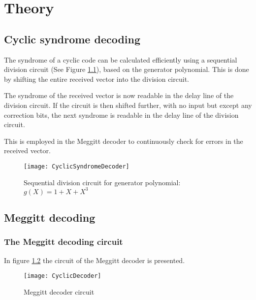 \documentclass[MiniProjectMain]{subfiles}
\begin{document}
\chapter{Theory}

\section{Cyclic syndrome decoding}
The syndrome of a cyclic code can be calculated efficiently using a sequential division circuit (See Figure \ref{fig:CyclicSyndromeDecoder}), based on the generator polynomial.
This is done by shifting the entire received vector into the division circuit.

The syndrome of the received vector is now readable in the delay line of the division circuit.
If the circuit is then shifted further, with no input but except any correction bits, the next syndrome is readable in the delay line of the division circuit.

This is employed in the Meggitt decoder to continuously check for errors in the received vector.

\begin{figure}[H]
\begin{center}
\texttt{[image: CyclicSyndromeDecoder]}
\caption{Sequential division circuit for generator polynomial: 
$g(X) = 1 + X + X^3$
}
\label{fig:CyclicSyndromeDecoder}
\end{center}
\end{figure}

\newpage
\section{Meggitt decoding}

\subsection{The Meggitt decoding circuit}
In figure \ref{fig:CyclicDecoder} the circuit of the Meggitt decoder is presented.


\begin{figure}[H]
\begin{center}
\texttt{[image: CyclicDecoder]}
\caption{Meggitt decoder circuit}
\label{fig:CyclicDecoder}
\end{center}
\end{figure}
\end{document}
